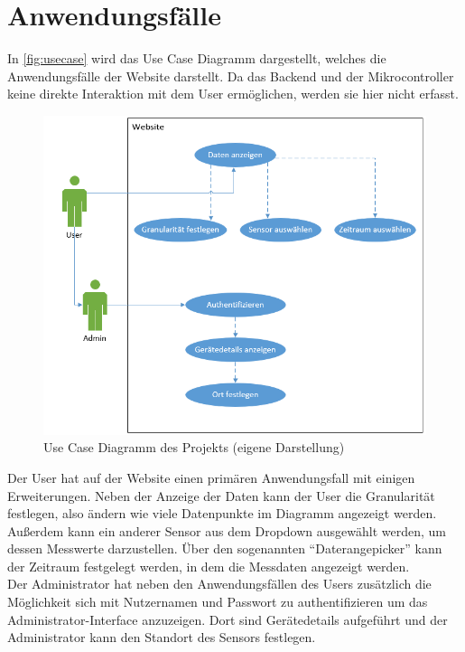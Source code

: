 \section{Anwendungsfälle}
In \autoref{fig:usecase} wird das Use Case Diagramm dargestellt, welches die Anwendungsfälle der Website darstellt.
Da das Backend und der Mikrocontroller keine direkte Interaktion mit dem User ermöglichen, werden sie hier nicht erfasst.\\
\begin{figure}[h]
    \centering
    \includegraphics[width=0.7\linewidth]{img/usecase}
    \caption[Use Case Diagramm des Projekts]{Use Case Diagramm des Projekts (eigene Darstellung)}
    \label{fig:usecase}
\end{figure}

Der User hat auf der Website einen primären Anwendungsfall mit einigen Erweiterungen.
Neben der Anzeige der Daten kann der User die Granularität festlegen, also ändern wie viele Datenpunkte im Diagramm angezeigt werden.
Außerdem kann ein anderer Sensor aus dem Dropdown ausgewählt werden, um dessen Messwerte darzustellen.
Über den sogenannten \enquote{Daterangepicker} kann der Zeitraum festgelegt werden, in dem die Messdaten angezeigt werden. \\
Der Administrator hat neben den Anwendungsfällen des Users zusätzlich die Möglichkeit sich mit Nutzernamen und Passwort zu authentifizieren um das Administrator-Interface anzuzeigen.
Dort sind Gerätedetails aufgeführt und der Administrator kann den Standort des Sensors festlegen.